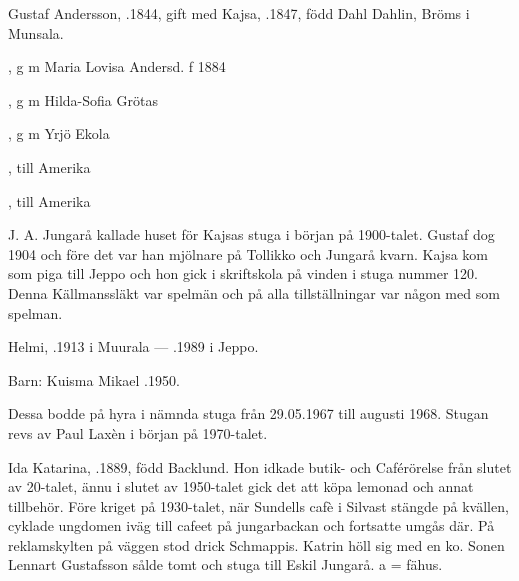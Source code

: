 Gustaf Andersson, .1844, gift med Kajsa, .1847, född Dahl Dahlin, Bröms i Munsala.
\begin{jhchildren}
  \item {}, g m Maria Lovisa Andersd. f 1884
  \item {}, g m Hilda-Sofia Grötas
  \item {}, g m Yrjö Ekola
  \item {}
  \item {}, till Amerika
  \item {}, till Amerika
  \item {}
\end{jhchildren}
J. A. Jungarå kallade huset för Kajsas stuga i början på 1900-talet. Gustaf dog 1904 och före det var han mjölnare på Tollikko och Jungarå kvarn. Kajsa kom som piga till Jeppo och hon gick i skriftskola på vinden i stuga nummer 120. Denna Källmanssläkt var spelmän och på alla tillställningar var någon med som spelman.





Helmi, .1913 i Muurala  ---  .1989 i Jeppo.

Barn: Kuisma Mikael .1950.

Dessa bodde på hyra i nämnda stuga från 29.05.1967 till augusti 1968. Stugan revs av Paul Laxèn i början på 1970-talet.



Ida Katarina, .1889, född Backlund. Hon idkade butik- och Caférörelse från slutet av 20-talet, ännu i slutet av 1950-talet gick det att köpa lemonad och annat tillbehör. Före kriget på 1930-talet, när Sundells cafè i Silvast stängde på kvällen, cyklade ungdomen iväg till cafeet på jungarbackan och fortsatte umgås där. På reklamskylten på väggen stod drick Schmappis. Katrin höll sig med en ko. Sonen Lennart Gustafsson sålde tomt och stuga till Eskil Jungarå. a  = fähus.


